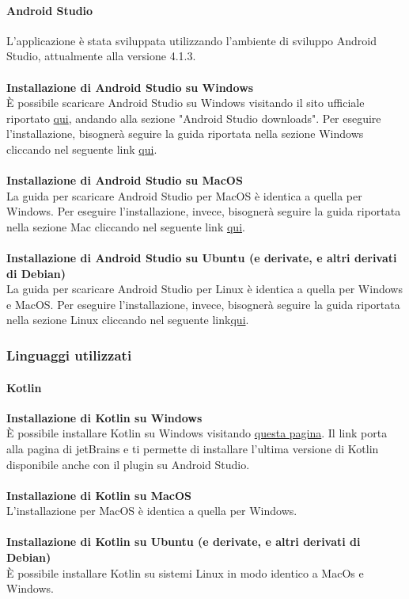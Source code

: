 \paragraph{Android Studio}
L'applicazione è stata sviluppata utilizzando l'ambiente di sviluppo Android Studio, attualmente alla versione 4.1.3.
\\
\\
\textbf{Installazione di Android Studio su Windows}
\\
È possibile scaricare Android Studio su Windows visitando il sito ufficiale riportato \href{https://developer.android.com/studio}{qui}, andando alla sezione "Android Studio downloads".
Per eseguire l'installazione, bisognerà seguire la guida riportata nella sezione Windows cliccando nel seguente link \href{https://developer.android.com/studio/install#windows}{qui}.
\\
\\
\textbf{Installazione di Android Studio su MacOS}
\\
La guida per scaricare Android Studio per MacOS è identica a quella per Windows.
Per eseguire l'installazione, invece, bisognerà seguire la guida riportata nella sezione Mac cliccando nel seguente link \href{https://developer.android.com/studio/install#mac}{qui}.
\\
\\
\textbf{Installazione di Android Studio su Ubuntu (e derivate, e altri derivati di Debian)}
\\
La guida per scaricare Android Studio per Linux è identica a quella per Windows e MacOS.
Per eseguire l'installazione, invece, bisognerà seguire la guida riportata nella sezione Linux cliccando nel seguente link\href{https://developer.android.com/studio/install#linux}{qui}.
\\
\subsubsection{Linguaggi utilizzati}

\paragraph{Kotlin}
\textbf{Installazione di Kotlin su Windows}
\\
È possibile installare Kotlin su Windows visitando \href{https://plugins.jetbrains.com/plugin/6954-kotlin/versions}{questa pagina}.
Il link porta alla pagina di jetBrains e ti permette di installare l'ultima versione di Kotlin disponibile anche con il plugin su Android Studio.
\\
\\
\textbf{Installazione di Kotlin su MacOS}
\\
L'installazione per MacOS è identica a quella per Windows.
\\
\\
\textbf{Installazione di Kotlin su Ubuntu (e derivate, e altri derivati di Debian)}
\\
È possibile installare Kotlin su sistemi Linux in modo identico a MacOs e Windows.

